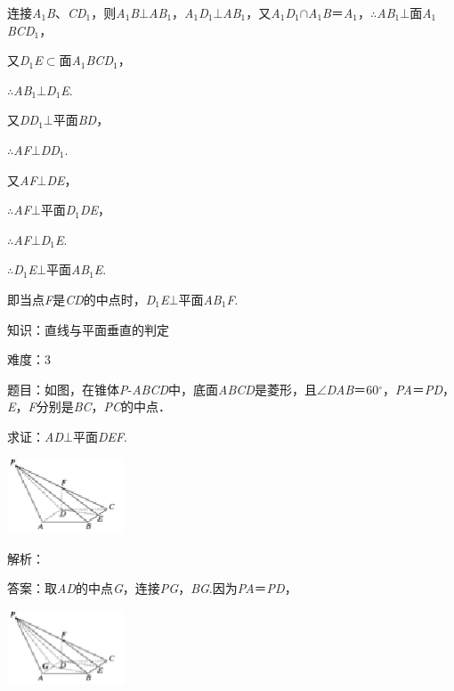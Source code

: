 \documentclass{article} %
\begin{document}
连接\textit{A}${}_{1}$\textit{B}、\textit{CD}${}_{1}$，则\textit{A}${}_{1}$\textit{B}$\mathrm{\bot}$\textit{AB}${}_{1}$，\textit{A}${}_{1}$\textit{D}${}_{1}$$\mathrm{\bot}$\textit{AB}${}_{1}$，又\textit{A}${}_{1}$\textit{D}${}_{1}$$\mathrm{\cap}$\textit{A}${}_{1}$\textit{B}＝\textit{A}${}_{1}$，$\mathrm{\therefore}$\textit{AB}${}_{1}$$\mathrm{\bot}$面\textit{A}${}_{1}$\textit{BCD}${}_{1}$，

又\textit{D}${}_{1}$\textit{E}$\mathrm{\subset }$面\textit{A}${}_{1}$\textit{BCD}${}_{1}$，

$\mathrm{\therefore}$\textit{AB}${}_{1}$$\mathrm{\bot}$\textit{D}${}_{1}$\textit{E}.

又\textit{DD}${}_{1}$$\mathrm{\bot}$平面\textit{BD}，

$\mathrm{\therefore}$\textit{AF}$\mathrm{\bot}$\textit{DD}${}_{1}$.

又\textit{AF}$\mathrm{\bot}$\textit{DE}，

$\mathrm{\therefore}$\textit{AF}$\mathrm{\bot}$平面\textit{D}${}_{1}$\textit{DE}，

$\mathrm{\therefore}$\textit{AF}$\mathrm{\bot}$\textit{D}${}_{1}$\textit{E}.

$\mathrm{\therefore}$\textit{D}${}_{1}$\textit{E}$\mathrm{\bot}$平面\textit{AB}${}_{1}$\textit{E}.

即当点\textit{F}是\textit{CD}的中点时，\textit{D}${}_{1}$\textit{E}$\mathrm{\bot}$平面\textit{AB}${}_{1}$\textit{F}. 

知识：直线与平面垂直的判定

难度：3

题目：如图，在锥体\textit{P}-\textit{ABCD}中，底面\textit{ABCD}是菱形，且$\mathrm{\angle}$\textit{DAB}＝60$\mathrm{{}^\circ}$，\textit{PA}＝\textit{PD}，\textit{E}，\textit{F}分别是\textit{BC}，\textit{PC}的中点．

求证：\textit{AD}$\mathrm{\bot}$平面\textit{DEF}.

\includegraphics*[width=1.38in, height=0.88in, keepaspectratio=false]{image207}

解析：

答案：取\textit{AD}的中点\textit{G}，连接\textit{PG}，\textit{BG}.因为\textit{PA}＝\textit{PD}，

\includegraphics*[width=1.38in, height=0.88in, keepaspectratio=false]{image208}
\end{document}
